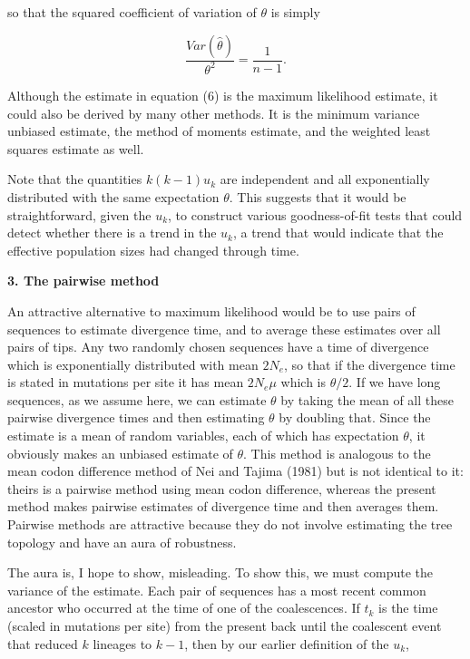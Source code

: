 so that the squared coefficient of variation of $\theta$ is simply

\begin{equation} %
   \frac{Var (\hat{\theta})}{\theta^2}  =  \frac{1}{n-1}.
\end{equation}

Although the estimate in equation (6) is the maximum likelihood
estimate, it could also be derived by many other methods.  It is the
minimum variance unbiased estimate, the method of moments estimate, and
the weighted least squares estimate as well.

Note that the quantities $k(k-1)u_k$ are independent and all exponentially
distributed with the same expectation $\theta$.  This suggests that it would
be straightforward, given the $u_k$, to construct various goodness-of-fit
tests that could detect 
whether there is a trend in the $u_k$, a trend that would indicate that
the effective population sizes had changed through time.

\bigskip

{\bf 3. The pairwise method}

\medskip
An attractive alternative to maximum likelihood would be to use pairs of
sequences to estimate divergence time, and to average these estimates over
all pairs of tips.  Any two randomly chosen sequences have a time of
divergence which is exponentially distributed with mean $2N_e$, so that
if the divergence time is stated in mutations per site it has mean $2N_e\mu$
which is $\theta/2$.  If we have long sequences, as we assume here, we can
estimate $\theta$ by taking the mean of all these pairwise divergence times and
then estimating $\theta$ by doubling that.  Since the estimate is a mean of
random variables, each of which has expectation $\theta$, it obviously
makes an unbiased estimate of $\theta$.  This method is analogous to the
mean codon difference method of Nei and Tajima (1981) but is not
identical to it: theirs is a pairwise method using mean codon
difference, whereas the present method makes pairwise estimates of
divergence time and then averages them.  Pairwise methods are attractive
because they do not involve estimating the tree topology and have an aura of
robustness.

The aura is, I hope to show, misleading.  To show this, we must compute
the variance of the estimate.  Each pair of sequences has a most recent
common ancestor who occurred at the time of one of the coalescences.  If
$t_k$ is the time (scaled in mutations per site) from the present back until
the coalescent event that reduced $k$ lineages to $k-1$,
then by our earlier definition of the $u_k$,

